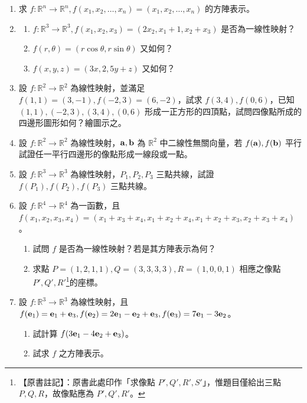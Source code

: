 \begin{enumerate}[label=\arabic*., leftmargin=2em]
  \item[\textbf{*22.}] 求 $f: \mathbb{R}^n \longrightarrow \mathbb{R}^n, f(x_1, x_2, \dots, x_n) = (x_1, x_2, \dots, x_n)$ 的方陣表示。

  \item
  \begin{enumerate}[label=(\alph*)]
    \item $f: \mathbb{R}^3 \longrightarrow \mathbb{R}^3, f(x_1, x_2, x_3) = (2x_2, x_1 + 1, x_2 + x_3)$ 是否為一線性映射？
    \item $f(r, \theta) = (r\cos\theta, r\sin\theta)$ 又如何？
    \item $f(x, y, z) = (3x, 2, 5y + z)$ 又如何？
  \end{enumerate}

  \item 設 $f: \mathbb{R}^2 \longrightarrow \mathbb{R}^2$ 為線性映射，並滿足 $f(1, 1) = (3, -1), f(-2, 3) = (6, -2)$，試求 $f(3, 4), f(0, 6)$，已知 $(1, 1), (-2, 3), (3, 4), (0, 6)$ 形成一正方形的四頂點，試問四像點所成的四邊形圖形如何？繪圖示之。

  \item 設 $f: \mathbb{R}^2 \longrightarrow \mathbb{R}^2$ 為線性映射，$\boldsymbol{\mathbf{a}}, \boldsymbol{\mathbf{b}}$ 為 $\mathbb{R}^2$ 中二線性無關向量，若 $f(\boldsymbol{\mathbf{a}}), f(\boldsymbol{\mathbf{b}})$ 平行試證任一平行四邊形的像點形成一線段或一點。

  \item 設 $f: \mathbb{R}^3 \longrightarrow \mathbb{R}^3$ 為線性映射，$P_1, P_2, P_3$ 三點共線，試證 $f(P_1), f(P_2), f(P_3)$ 三點共線。

  \item 設 $f: \mathbb{R}^4 \longrightarrow \mathbb{R}^4$ 為一函數，且 $f(x_1, x_2, x_3, x_4) = (x_1 + x_3 + x_4, x_1 + x_2 + x_4, x_1 + x_2 + x_3, x_2 + x_3 + x_4)$。
  \begin{enumerate}[label=(\alph*)]
    \item 試問 $f$ 是否為一線性映射？若是其方陣表示為何？
    \item 求點 $P=(1, 2, 1, 1), Q=(3, 3, 3, 3), R=(1, 0, 0, 1)$ 相應之像點 $P', Q', R'$\label{note:b6s-ch1-p22-ex28-s}\footnote{【原書註記】：原書此處印作「求像點 $P', Q', R', S'$」，惟題目僅給出三點 $P, Q, R$，故像點應為 $P', Q', R'$。}的座標。
  \end{enumerate}

  \item 設 $f: \mathbb{R}^3 \longrightarrow \mathbb{R}^3$ 為線性映射，且 $f(\boldsymbol{\mathbf{e}}_1) = \boldsymbol{\mathbf{e}}_1 + \boldsymbol{\mathbf{e}}_3, f(\boldsymbol{\mathbf{e}}_2) = 2\boldsymbol{\mathbf{e}}_1 - \boldsymbol{\mathbf{e}}_2 + \boldsymbol{\mathbf{e}}_3, f(\boldsymbol{\mathbf{e}}_3) = 7\boldsymbol{\mathbf{e}}_1 - 3\boldsymbol{\mathbf{e}}_2$。
  \begin{enumerate}[label=(\alph*)]
    \item 試計算 $f(3\boldsymbol{\mathbf{e}}_1 - 4\boldsymbol{\mathbf{e}}_2 + \boldsymbol{\mathbf{e}}_3)$。
    \item 試求 $f$ 之方陣表示。
  \end{enumerate}

\end{enumerate}

